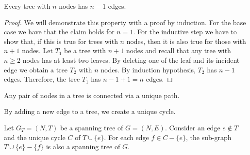 \documentclass[12pt, a4paper]{report}
\begin{document}
    \begin{property}
        Every tree with $n$ nodes has $n-1$ edges. 
    \end{property}
    \begin{proof}
        We will demonstrate this property with a proof by induction. 
        For the base case we have that the claim holds for $n=1$. 
        For the inductive step we have to show that, if this is true for trees with $n$ nodes, then it is also true for those with $n+1$ nodes. 
        Let $T_1$ be a tree with $n+1$ nodes and recall that any tree with $n \geq 2$ nodes has at least two leaves. 
        By deleting one of the leaf and its incident edge we obtain a tree $T_2$ with $n$ nodes. 
        By induction hypothesis, $T_2$ has $n-1$ edges. 
        Therefore, the tree $T_1$ has $n-1+1=n$ edges. 
    \end{proof}
    \begin{property}
        Any pair of nodes in a tree is connected via a unique path. 
    \end{property}
    \begin{property}
        By adding a new edge to a tree, we create a unique cycle. 
    \end{property}
    \begin{property}
        Let $G_T=(N,T)$ be a spanning tree of $G=(N,E)$. 
        Consider an edge $e \notin T$ and the unique cycle $C$ of $T \cup \{e\}$. 
        For each edge $f \in C-\{e\}$, the sub-graph $T\cup \{e\}-\{f\}$ is also a spanning tree of $G$. 
    \end{property}
\end{document}
